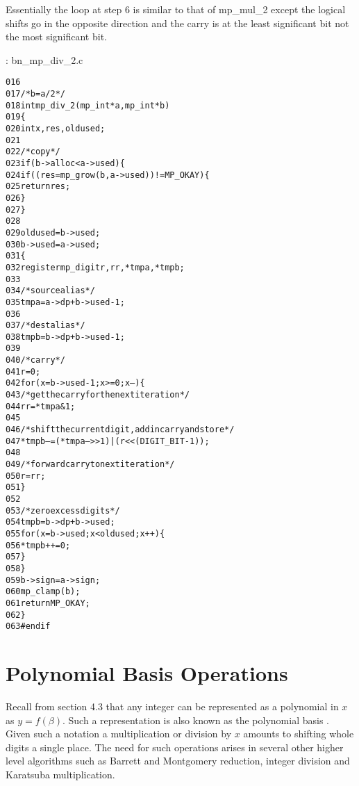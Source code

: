 \documentclass[b5paper]{book}
\begin{document}
Essentially the loop at step 6 is similar to that of mp\_mul\_2 except the logical shifts go in the opposite direction and the carry is at the 
least significant bit not the most significant bit.  

\vspace{+3mm}\begin{small}
\hspace{-5.1mm}{\bf File}: bn\_mp\_div\_2.c
\vspace{-3mm}
\begin{alltt}
016   
017   /* b = a/2 */
018   int mp_div_2(mp_int * a, mp_int * b)
019   \{
020     int     x, res, oldused;
021   
022     /* copy */
023     if (b->alloc < a->used) \{
024       if ((res = mp_grow (b, a->used)) != MP_OKAY) \{
025         return res;
026       \}
027     \}
028   
029     oldused = b->used;
030     b->used = a->used;
031     \{
032       register mp_digit r, rr, *tmpa, *tmpb;
033   
034       /* source alias */
035       tmpa = a->dp + b->used - 1;
036   
037       /* dest alias */
038       tmpb = b->dp + b->used - 1;
039   
040       /* carry */
041       r = 0;
042       for (x = b->used - 1; x >= 0; x--) \{
043         /* get the carry for the next iteration */
044         rr = *tmpa & 1;
045   
046         /* shift the current digit, add in carry and store */
047         *tmpb-- = (*tmpa-- >> 1) | (r << (DIGIT_BIT - 1));
048   
049         /* forward carry to next iteration */
050         r = rr;
051       \}
052   
053       /* zero excess digits */
054       tmpb = b->dp + b->used;
055       for (x = b->used; x < oldused; x++) \{
056         *tmpb++ = 0;
057       \}
058     \}
059     b->sign = a->sign;
060     mp_clamp (b);
061     return MP_OKAY;
062   \}
063   #endif
\end{alltt}
\end{small}

\section{Polynomial Basis Operations}
Recall from section 4.3 that any integer can be represented as a polynomial in $x$ as $y = f(\beta)$.  Such a representation is also known as
the polynomial basis \cite[pp. 48]{ROSE}. Given such a notation a multiplication or division by $x$ amounts to shifting whole digits a single 
place.  The need for such operations arises in several other higher level algorithms such as Barrett and Montgomery reduction, integer
division and Karatsuba multiplication.  
\end{document}
